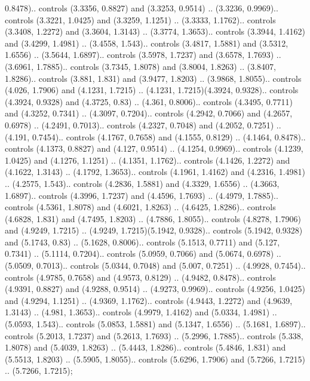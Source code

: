 0.8478).. controls (3.3356, 0.8827) and (3.3253, 0.9514) .. (3.3236, 0.9969).. controls (3.3221, 1.0425) and (3.3259, 1.1251) .. (3.3333, 1.1762).. controls (3.3408, 1.2272) and (3.3604, 1.3143) .. (3.3774, 1.3653).. controls (3.3944, 1.4162) and (3.4299, 1.4981) .. (3.4558, 1.543).. controls (3.4817, 1.5881) and (3.5312, 1.6556) .. (3.5644, 1.6897).. controls (3.5978, 1.7237) and (3.6578, 1.7693) .. (3.6961, 1.7885).. controls (3.7345, 1.8078) and (3.8004, 1.8263) .. (3.8407, 1.8286).. controls (3.881, 1.831) and (3.9477, 1.8203) .. (3.9868, 1.8055).. controls (4.026, 1.7906) and (4.1231, 1.7215) .. (4.1231, 1.7215)(4.3924, 0.9328).. controls (4.3924, 0.9328) and (4.3725, 0.83) .. (4.361, 0.8006).. controls (4.3495, 0.7711) and (4.3252, 0.7341) .. (4.3097, 0.7204).. controls (4.2942, 0.7066) and (4.2657, 0.6978) .. (4.2491, 0.7013).. controls (4.2327, 0.7048) and (4.2052, 0.7251) .. (4.191, 0.7454).. controls (4.1767, 0.7658) and (4.1555, 0.8129) .. (4.1464, 0.8478).. controls (4.1373, 0.8827) and (4.127, 0.9514) .. (4.1254, 0.9969).. controls (4.1239, 1.0425) and (4.1276, 1.1251) .. (4.1351, 1.1762).. controls (4.1426, 1.2272) and (4.1622, 1.3143) .. (4.1792, 1.3653).. controls (4.1961, 1.4162) and (4.2316, 1.4981) .. (4.2575, 1.543).. controls (4.2836, 1.5881) and (4.3329, 1.6556) .. (4.3663, 1.6897).. controls (4.3996, 1.7237) and (4.4596, 1.7693) .. (4.4979, 1.7885).. controls (4.5361, 1.8078) and (4.6021, 1.8263) .. (4.6425, 1.8286).. controls (4.6828, 1.831) and (4.7495, 1.8203) .. (4.7886, 1.8055).. controls (4.8278, 1.7906) and (4.9249, 1.7215) .. (4.9249, 1.7215)(5.1942, 0.9328).. controls (5.1942, 0.9328) and (5.1743, 0.83) .. (5.1628, 0.8006).. controls (5.1513, 0.7711) and (5.127, 0.7341) .. (5.1114, 0.7204).. controls (5.0959, 0.7066) and (5.0674, 0.6978) .. (5.0509, 0.7013).. controls (5.0344, 0.7048) and (5.007, 0.7251) .. (4.9928, 0.7454).. controls (4.9785, 0.7658) and (4.9573, 0.8129) .. (4.9482, 0.8478).. controls (4.9391, 0.8827) and (4.9288, 0.9514) .. (4.9273, 0.9969).. controls (4.9256, 1.0425) and (4.9294, 1.1251) .. (4.9369, 1.1762).. controls (4.9443, 1.2272) and (4.9639, 1.3143) .. (4.981, 1.3653).. controls (4.9979, 1.4162) and (5.0334, 1.4981) .. (5.0593, 1.543).. controls (5.0853, 1.5881) and (5.1347, 1.6556) .. (5.1681, 1.6897).. controls (5.2013, 1.7237) and (5.2613, 1.7693) .. (5.2996, 1.7885).. controls (5.338, 1.8078) and (5.4039, 1.8263) .. (5.4443, 1.8286).. controls (5.4846, 1.831) and (5.5513, 1.8203) .. (5.5905, 1.8055).. controls (5.6296, 1.7906) and (5.7266, 1.7215) .. (5.7266, 1.7215);



